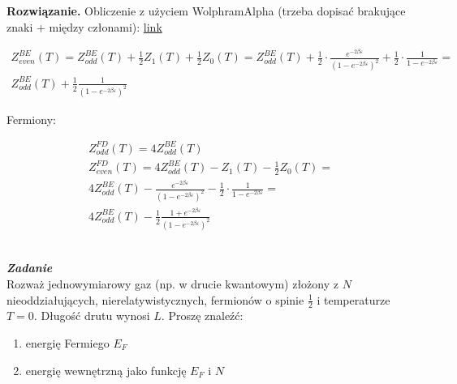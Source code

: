 \documentclass[11pt,a4paper]{article}
\newcounter{zadanie}\newcommand{\zadanie}[1][]{\addtocounter{zadanie}{1} ~\\ {\bf \emph{Zadanie \arabic{zadanie} #1 }} \\}
\newenvironment{solution}{\vspace{1cm} \par\textbf{Rozwiązanie.} \vspace{1cm}}{}
\begin{document}
\begin{solution}
Obliczenie z użyciem WolphramAlpha (trzeba dopisać brakujące znaki + między członami):
\href{https://www.wolframalpha.com/input?i=%5Bd%5E3%2Fdx%5E3+%281%2F3%2F%281-e%5Ex%29%29%5D+++%2B+%5Bd%5E2%2Fdx%5E2+%281%2F%281-e%5Ex%29%29%5D+%2B++%5Bd%2Fdx+%287%2F6%2F%281-e%5Ex%29%29%5D+%2B++1%2F2%2F%281-e%5Ex%29}{link}


\begin{align*}
  Z_{even}^{BE}(T) = Z_{odd}^{BE}(T) + \frac{1}{2}Z_{1}(T)  + \frac{1}{2}Z_{0}(T)
  = Z_{odd}^{BE}(T) + 
  \frac{1}{2} \cdot \frac{e^{-2\beta \varepsilon}}{(1 - e^{-2\beta \varepsilon})^{2}} + 
  \frac{1}{2} \cdot \frac{1}{1 - e^{-2\beta \varepsilon}} = \\
  Z_{odd}^{BE}(T) + \frac{1}{2} \frac{1}{(1 - e^{-2\beta \varepsilon})^{2}}
\end{align*}

Fermiony:

\begin{align*}
  Z_{odd}^{FD}(T) = 4 Z_{odd}^{BE}(T) \\
  Z_{even}^{FD}(T) = 4 Z_{odd}^{BE}(T) - Z_{1}(T) - \frac{1}{2}Z_{0}(T) = \\
  4 Z_{odd}^{BE}(T) - \frac{e^{-2\beta \varepsilon}}{(1 - e^{-2\beta \varepsilon})^{2}} - \frac{1}{2} \cdot \frac{1}{1 - e^{-2\beta \varepsilon}} = \\
  4 Z_{odd}^{BE}(T) - \frac{1}{2} \frac{1 + e^{-2\beta \varepsilon}}{(1 - e^{-2\beta \varepsilon})^{2}}
\end{align*}

\newpage
\end{solution}

\zadanie[]

Rozważ jednowymiarowy gaz (np. w drucie kwantowym) złożony z $N$ nieoddziałujących, 
nierelatywistycznych, fermionów o spinie $\frac{1}{2}$ i temperaturze $T=0$. 
Długość drutu wynosi $L$. Proszę znaleźć:
\begin{enumerate}[label=\alph*)]
\item energię Fermiego $E_F$ 
\item energię wewnętrzną jako funkcję $E_F$ i $N$
\end{enumerate}
\end{document}
